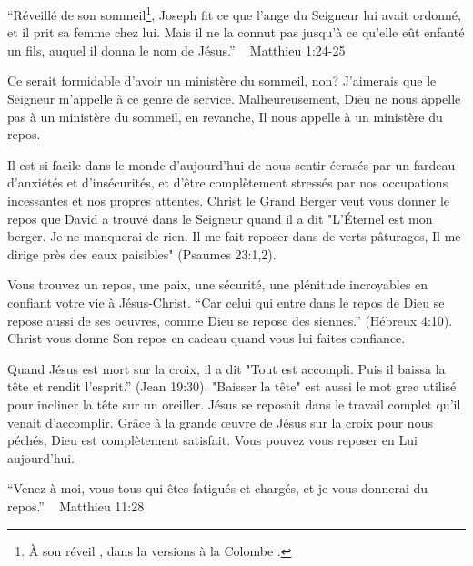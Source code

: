 

“Réveillé de son sommeil\footnote{\og À son réveil \fg, dans la versions \og à la Colombe \fg.}, Joseph fit ce que l’ange du Seigneur lui avait ordonné, et il prit sa femme chez lui. Mais il ne la connut pas jusqu’à ce qu’elle eût enfanté un fils, auquel il donna le nom de Jésus.” ~ Matthieu 1:24-25

Ce serait formidable d'avoir un ministère du sommeil, non? J'aimerais que le Seigneur m'appelle à ce genre de service. Malheureusement, Dieu ne nous appelle pas à un ministère du sommeil, en revanche, Il nous appelle à un ministère du repos.

Il est si facile dans le monde d'aujourd'hui de nous sentir écrasés par un fardeau d'anxiétés et d'insécurités, et d'être complètement stressés par nos occupations incessantes et nos propres attentes. Christ le Grand Berger veut vous donner le repos que David a trouvé dans le Seigneur quand il a dit "L’Éternel est mon berger. Je ne manquerai de rien. Il me fait reposer dans de verts pâturages, Il me dirige près des eaux paisibles" (Psaumes 23:1,2).

Vous trouvez un repos, une paix, une sécurité, une plénitude incroyables en confiant votre vie à Jésus-Christ. “Car celui qui entre dans le repos de Dieu se repose aussi de ses oeuvres, comme Dieu se repose des siennes.” (Hébreux 4:10). Christ vous donne Son repos en cadeau quand vous lui faites confiance.

Quand Jésus est mort sur la croix, il a dit "Tout est accompli. Puis il baissa la tête et rendit l’esprit.” (Jean 19:30). "Baisser la tête" est aussi le mot grec utilisé pour incliner la tête sur un oreiller. Jésus se reposait dans le travail complet qu'il venait d'accomplir. Grâce à la grande œuvre de Jésus sur la croix pour nous péchés, Dieu est complètement satisfait. Vous pouvez vous reposer en Lui aujourd'hui.


“Venez à moi, vous tous qui êtes fatigués et chargés, et je vous donnerai du repos.”  ~ Matthieu 11:28
